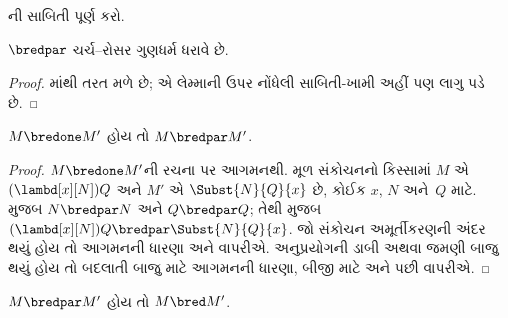 \begin{prob}
  ની સાબિતી પૂર્ણ કરો.
\end{prob}

\begin{thm}
  $\bredpar$ ચર્ચ--રોસર ગુણધર્મ ધરાવે છે.
\end{thm}

\begin{proof}
  માંથી તરત મળે છે; એ લેમ્માની
  ઉપર નોંધેલી સાબિતી-ખામી અહીં પણ લાગુ પડે છે.
\end{proof}
\endgroup

\begingroup
\makeatletter{}\makeatother


\label{guunit:OLP-0370}


\begin{lem}
  $M \bredone M'$ હોય તો $M \bredpar M'$.
\end{lem}
\begin{proof}
  $M \bredone M'$ની રચના પર આગમનથી. મૂળ સંકોચનનો
  કિસ્સામાં $M$ એ $(\lambd[x][N])Q$ અને
  $M'$ એ $\Subst{N}{Q}{x}$ છે, કોઈક
  $x$, $N$ અને~$Q$ માટે. 
  મુજબ $N \bredpar N$ અને $Q \bredpar Q$;
  તેથી 
  મુજબ $(\lambd[x][N])Q \bredpar
  \Subst{N}{Q}{x}$. જો સંકોચન અમૂર્તીકરણની અંદર
  થયું હોય તો આગમનની ધારણા અને
   વાપરીએ. અનુપ્રયોગની
  ડાબી અથવા જમણી બાજુ થયું હોય તો બદલાતી બાજુ
  માટે આગમનની ધારણા, બીજી માટે
   અને પછી
   વાપરીએ.
\end{proof}

\begin{lem}
  $M \bredpar M'$ હોય તો $M \bred M'$.
\end{lem}


